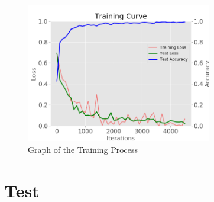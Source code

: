 \documentclass[conference]{IEEEtran}
\begin{document}
	\begin{figure}[h]
	\centering
	\includegraphics[width=3.2in]{entrenamiento}
	\caption{ Graph of the Training Process }
	\label{fig_sim}
	\end{figure}
	
	\section{Test}
	
	
	
	
	
\end{document}
